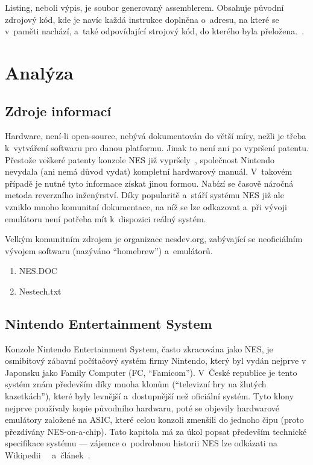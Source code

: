 \begin{definition}[Listing]
	Listing, neboli výpis, je soubor generovaný assemblerem. Obsahuje původní zdrojový kód, kde je navíc každá instrukce doplněna o~adresu, na které se v~paměti nachází, a~také odpovídající strojový kód, do kterého byla přeložena.~\cite{Plantz2021:computer-organization}.
\end{definition}

\chapter{Analýza}
\section{Zdroje informací}
Hardware, není-li open-source, nebývá dokumentován do větší míry, nežli je třeba k~vytváření softwaru pro danou platformu. Jinak to není ani po vypršení patentu. Přestože veškeré patenty konzole NES již vypršely~\cite{Nesdev:patents}, společnost Nintendo nevydala (ani nemá důvod vydat) kompletní hardwarový manuál. V~takovém případě je nutné tyto informace získat jinou formou. Nabízí se časově náročná metoda reverzního inženýrství. Díky popularitě a~stáří systému NES již ale vzniklo mnoho komunitní dokumentace, na níž se lze odkazovat a~při vývoji emulátoru není potřeba mít k~dispozici reálný systém.

Velkým komunitním zdrojem je organizace nesdev.org, zabývající se neoficiálním vývojem softwaru (nazýváno \enquote{homebrew}) a~emulátorů.


\begin{enumerate}
	\item NES.DOC
	\item Nestech.txt
\end{enumerate}

\section{Nintendo Entertainment System}
Konzole Nintendo Entertainment System, často zkracována jako NES, je osmibitový zábavní počítačový systém firmy Nintendo, který byl vydán nejprve v Japonsku jako Family Computer (FC, \enquote{Famicom}). V~České republice je tento systém znám především díky mnoha klonům (\enquote{televizní hry na žlutých kazetkách}), které byly levnější a~dostupnější než oficiální systém. Tyto klony nejprve používaly kopie původního hardwaru, poté se objevily hardwarové emulátory založené na ASIC, které celou konzoli zmenšili do jednoho čipu (proto přezdívány NES-on-a-chip). Tato kapitola má za úkol popsat především technické specifikace systému --- zájemce o~podrobnou historii NES lze odkázati na Wikipedii~\cite{Wikipedia:NES}~\cite{Wikipedia:famiclone} a~článek~\cite{Svara:polystation}.


